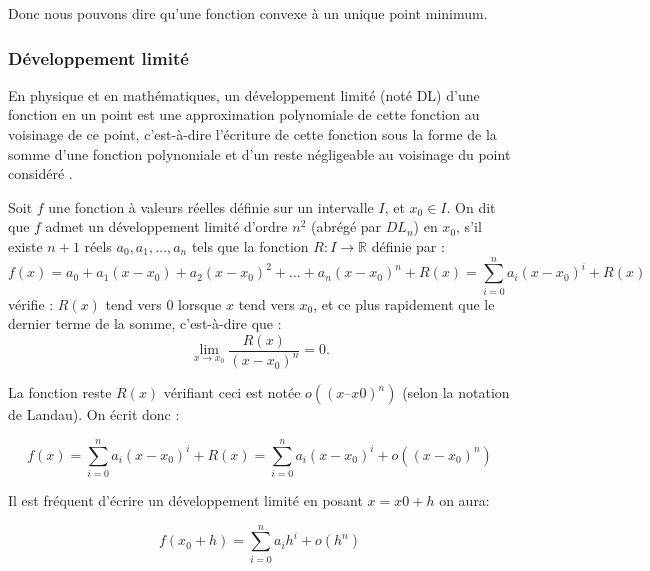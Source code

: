 		Donc nous pouvons dire qu'une fonction convexe à un unique point minimum.
		
		 
	\subsubsection{\textbf{Développement limité}}\label{sec:dev_lim}
		En physique et en mathématiques, un développement limité (noté DL) d'une fonction en un point est une approximation polynomiale de cette fonction au voisinage de ce point, c'est-à-dire l'écriture de cette fonction sous la forme de la somme d'une fonction polynomiale et d'un reste négligeable au voisinage du point considéré \cite{coulombeau2013math}.
		
		Soit $f$ une fonction à valeurs réelles définie sur un intervalle $I$, et $x_0 \in I$. On dit que $f$ admet un développement limité d'ordre $n^2$ (abrégé par $DL_n$) en $x_0$, s'il existe $n + 1$ réels $a_0, a_1, \dots, a_n$  tels que la fonction ${\displaystyle R:I\to \mathbb {R} }$ définie par :
		$${\displaystyle f(x)=a_{0}+a_{1}(x-x_{0})+a_{2}(x-x_{0})^{2}+\dots+a_{n}(x-x_{0})^{n}+R(x)=\sum _{i=0}^{n}a_{i}(x-x_{0})^{i}+R(x)}$$
		vérifie : $R(x)$ tend vers $0$ lorsque $x$ tend vers $x_0$, et ce plus rapidement que le dernier terme de la somme, c'est-à-dire que :
		$$
			\lim _{{x\rightarrow x_{0}}}{\frac{R(x)}{(x-x_{0})^{n}}}=0. 
		$$
		
		La fonction reste $R(x)$ vérifiant ceci est notée $o((x – x0)^n)$ (selon la notation de Landau). On écrit donc :
		
		$$
			f(x)= \sum _{i=0}^{n}a_{i}(x-x_{0})^{i}+R(x) =\sum _{{i=0}}^{n}a_{i}(x-x_{0})^{i}+o((x-x_{0})^{n})
		$$
		
		
		Il est fréquent d'écrire un développement limité en posant $x = x0 + h$ on aura:
		
		
		$$
			f(x_{0}+h)=\sum _{{i=0}}^{n}a_{i}h^{i}+o(h^{n})
		$$
		
